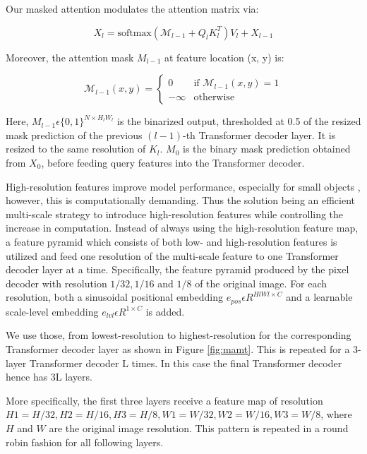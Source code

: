 Our masked attention modulates the attention matrix via:

\begin{equation}
    X_l = \text{softmax}(\mathcal{M}_{l-1} + Q_l K_l^T) V_l + X_{l-1} \tag{7}
\end{equation}


Moreover, the attention mask $M_{l-1}$ at feature location (x, y) is:

\begin{equation}
    \mathcal{M}_{l-1}(x, y) = 
    \begin{cases} 
    0 & \text{if } \mathcal{M}_{l-1}(x, y) = 1 \\
    -\infty & \text{otherwise} 
    \end{cases}  \tag{8}
\end{equation}
    

Here, $M_{l-1} \epsilon \{0, 1\}^{N \times H_l W_l}$  is the binarized output, thresholded at 0.5 of the resized mask prediction of the previous $(l - 1)$-th 
Transformer decoder layer. It is resized to the same resolution of $K_l$. $M_0$ is the binary mask prediction obtained from $X_0$, before feeding query features
into the Transformer decoder.

High-resolution features improve model performance, especially for small objects \cite{e2evisiontr}, however, this is computationally demanding. 
Thus the solution being an efficient multi-scale strategy to introduce high-resolution features while controlling the increase in computation. 
Instead of always using the high-resolution feature map, a feature pyramid which consists of both low- and high-resolution features is utilized and 
feed one resolution of the  multi-scale feature to one Transformer decoder layer at a time. Specifically, the feature pyramid produced by the 
pixel decoder with resolution $1/32, 1/16$ and $1/8$ of the original image. For each resolution, both a sinusoidal positional embedding 
$e_{pos} \epsilon R^{HlWl×C}$ and a learnable scale-level embedding $e_{lvl} \epsilon R^{1 \times C}$ is added. 

We use those, from lowest-resolution to highest-resolution for the corresponding Transformer decoder layer as shown in Figure \ref{fig:mamt}. This is 
repeated for a 3-layer Transformer decoder L times. In this case the final Transformer decoder hence has 3L layers. 

More specifically, the first three layers receive a feature map of resolution $H1 = H/32, H2 = H/16, H3 = H/8, W1 = W/32, W2 = W/16, W3 = W/8$, 
where $H$ and $W$ are the original image resolution. This pattern is repeated in a round robin fashion for all following layers.


